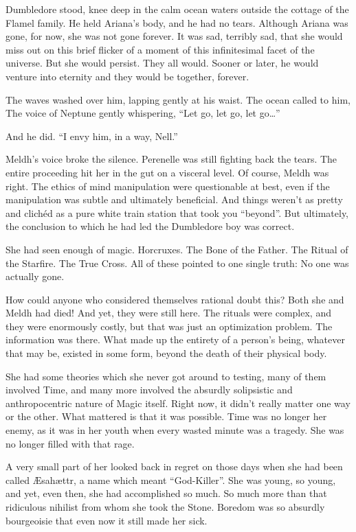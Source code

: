 Dumbledore stood, knee deep in the calm ocean waters outside the cottage of the Flamel family. He held Ariana’s body, and he had no tears. Although Ariana was gone, for now, she was not gone forever. It was sad, terribly sad, that she would miss out on this brief flicker of a moment of this infinitesimal facet of the universe. But she would persist. They all would. Sooner or later, he would venture into eternity and they would be together, forever.

The waves washed over him, lapping gently at his waist. The ocean called to him, The voice of Neptune gently whispering, “Let go, let go, let go…”

And he did.
\simpleline
“I envy him, in a way, Nell.”

Meldh’s voice broke the silence. Perenelle was still fighting back the tears. The entire proceeding hit her in the gut on a visceral level. Of course, Meldh was right. The ethics of mind manipulation were questionable at best, even if the manipulation was subtle and ultimately beneficial. And things weren’t as pretty and clichéd as a pure white train station that took you “beyond”. But ultimately, the conclusion to which he had led the Dumbledore boy was correct.

She had seen enough of magic. Horcruxes. The Bone of the Father. The Ritual of the Starfire. The True Cross. All of these pointed to one single truth: No one was actually gone.

How could anyone who considered themselves rational doubt this? Both she and Meldh had died! And yet, they were still here. The rituals were complex, and they were enormously costly, but that was just an optimization problem. The information was there. What made up the entirety of a person’s being, whatever that may be, existed in some form, beyond the death of their physical body.

She had some theories which she never got around to testing, many of them involved Time, and many more involved the absurdly solipsistic and anthropocentric nature of Magic itself. Right now, it didn’t really matter one way or the other. What mattered is that it was possible. Time was no longer her enemy, as it was in her youth when every wasted minute was a tragedy. She was no longer filled with that rage.

A very small part of her looked back in regret on those days when she had been called Æsahættr, a name which meant “God-Killer”. She was young, so young, and yet, even then, she had accomplished so much. So much more than that ridiculous nihilist from whom she took the Stone. Boredom was so absurdly bourgeoisie that even now it still made her sick.

